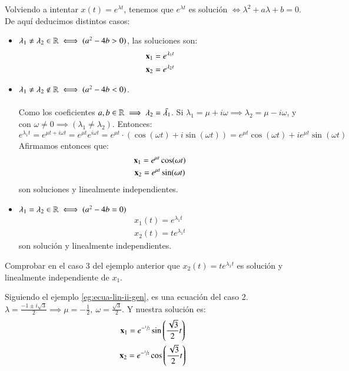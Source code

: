 \begin{eg}[Ecuación lineal de orden 2: $\mbf{x}'' + a\mbf{x}' + b\mbf{x} = 0$]\label{eg:ecua-lin-ii-gen}
    Volviendo a intentar $x(t) = e^{\lambda t}$, tenemos que $e^{\lambda t}$ es solución $\iff \lambda^2+a\lambda+b=0$. De aquí deducimos distintos casos:
        \begin{itemize}
            \item $\lambda_1 \neq \lambda_2 \in \mathbb{R} \iff (a^2 - 4b > 0)$, las soluciones son:
            \begin{gather*}
                \mathbf{x}_1 = e^{\lambda_1 t} \\ \mathbf{x}_2 = e^{\lambda_2 t}
            \end{gather*}
            \item $\lambda_1 \neq \lambda_2 \not\in \mathbb{R} \iff (a^2 - 4b < 0)$.\\\\
            Como los coeficientes $a,b \in \mathbb{R} \implies \lambda_2 = \bar{\lambda_1}$. Si $\lambda_1 = \mu + i \omega \implies \lambda_2 = \mu - i \omega$, y con $\omega \neq 0 \implies (\lambda_1 \neq \lambda_2)$. Entonces:
            $$
                e^{\lambda_1 t} = e^{\mu t + i \omega t} = e^{\mu t} e^{i\omega t} = e^{\mu t} \cdot (\cos(\omega t) + i\sin(\omega t)) = e^{\mu t} \cos(\omega t) + i e^{\mu t} \sin (\omega t)
            $$
            Afirmamos entonces que:
            \begin{gather*}
                \mathbf{x}_1 = e^{\mu t} \cos(\omega t) \\ \mathbf{x}_2 = e^{\mu t} \sin(\omega t)
            \end{gather*}
            son soluciones y linealmente independientes.
            \item $\lambda_1 = \lambda_2 \in \mathbb{R} \iff (a^2 - 4b = 0)$
            \begin{gather*}
                x_1(t) = e^{\lambda_1 t} \\ x_2(t) = t e^{\lambda_1 t}
            \end{gather*} son solución y linealmente independientes.
        \end{itemize}
\end{eg}

\begin{th_ex}
    Comprobar en el caso 3 del ejemplo anterior que $x_2(t) = t e^{\lambda_1 t}$ es solución y linealmente independiente de $x_1$.
\end{th_ex}

\begin{eg}[Ecuación lineal de orden 2: $ \mbf{x}'' + \mbf{x}' + \mbf{x} = 0 $]
    Siguiendo el ejemplo \ref{eg:ecua-lin-ii-gen}, es una ecuación del caso 2. $\lambda = \frac{-1 \pm i\sqrt{3}}{2} \implies \mu = -\frac{1}{2},\ \omega = \frac{\sqrt{3}}{2}$. Y nuestra solución es:
    \begin{gather*}
        \mathbf{x}_1 = e^{-\sfrac{1}{2}} \sin\left(\frac{\sqrt{3}}{2}t\right) \\ \mathbf{x}_2 = e^{-\sfrac{1}{2}} \cos\left(\frac{\sqrt{3}}{2}t\right)
    \end{gather*}
\end{eg}

